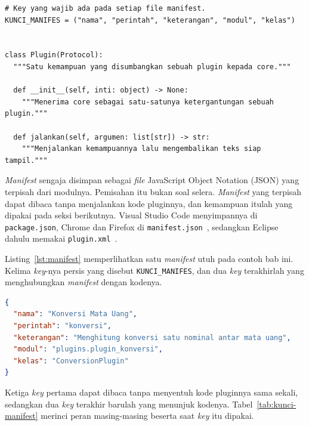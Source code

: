 \begin{lstlisting}[style=PythonStyle, caption={Kontrak yang wajib dipenuhi
  setiap \textit{plugin}, tersedia di \berkas{sources/chapter05/kontrak.py}},
  label=lst:kontrak]
# Key yang wajib ada pada setiap file manifest.
KUNCI_MANIFES = ("nama", "perintah", "keterangan", "modul", "kelas")


class Plugin(Protocol):
  """Satu kemampuan yang disumbangkan sebuah plugin kepada core."""

  def __init__(self, inti: object) -> None:
    """Menerima core sebagai satu-satunya ketergantungan sebuah plugin."""

  def jalankan(self, argumen: list[str]) -> str:
    """Menjalankan kemampuannya lalu mengembalikan teks siap tampil."""
\end{lstlisting}

\textit{Manifest} sengaja disimpan sebagai \textit{file} JavaScript Object
Notation (JSON) yang terpisah dari modulnya. Pemisahan itu bukan soal selera.
\textit{Manifest} yang terpisah dapat dibaca tanpa menjalankan kode pluginnya,
dan kemampuan itulah yang dipakai pada seksi berikutnya. Visual Studio Code
menyimpannya di \texttt{package.json}, Chrome dan Firefox di
\texttt{manifest.json}~\cite{chrome2026content,mozilla2026manifest}, sedangkan
Eclipse dahulu memakai \texttt{plugin.xml}~\cite{bolour2003eclipse}.

Listing~\ref{lst:manifest} memperlihatkan satu \textit{manifest} utuh pada
contoh bab ini. Kelima \textit{key}-nya persis yang disebut \texttt{KUNCI\_MANIFES},
dan dua \textit{key} terakhirlah yang menghubungkan \textit{manifest} dengan kodenya.

\begin{lstlisting}[language=json, caption={\textit{Manifest} \textit{plugin}
  konversi, tersedia di \berkas{sources/chapter05/plugins/plugin_konversi.json}},
  label=lst:manifest]
{
  "nama": "Konversi Mata Uang",
  "perintah": "konversi",
  "keterangan": "Menghitung konversi satu nominal antar mata uang",
  "modul": "plugins.plugin_konversi",
  "kelas": "ConversionPlugin"
}
\end{lstlisting}

Ketiga \textit{key} pertama dapat dibaca tanpa menyentuh kode pluginnya sama sekali,
sedangkan dua \textit{key} terakhir barulah yang menunjuk kodenya.
Tabel~\ref{tab:kunci-manifest} merinci peran masing-masing beserta saat \textit{key}
itu dipakai.

